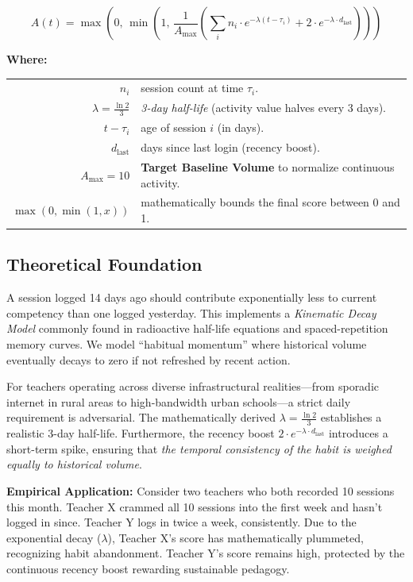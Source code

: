 \documentclass[11pt,a4paper]{article}
\begin{document}
\begin{equation}
    A(t) = \max\left(0,\, \min\left(1,\, \frac{1}{A_{\max}}\left(\sum_{i} n_i \cdot e^{-\lambda(t - \tau_i)} + 2 \cdot e^{-\lambda \cdot d_{\text{last}}}\right)\right)\right)
\end{equation}

\noindent \textbf{Where:}

\vspace{0.25em}
\noindent
\begin{tabular}{@{} r p{11cm} @{}}
    $n_i$ & session count at time $\tau_i$. \\
    $\lambda = \frac{\ln 2}{3}$ & \textit{3-day half-life} (activity value halves every 3 days). \\
    $t - \tau_i$ & age of session $i$ (in days). \\
    $d_{\text{last}}$ & days since last login (recency boost). \\
    $A_{\max} = 10$ & \textbf{Target Baseline Volume} to normalize continuous activity. \\
    $\max(0, \min(1, x))$ & mathematically bounds the final score between 0 and 1. \\
\end{tabular}

\subsection{Theoretical Foundation}
A session logged 14 days ago should contribute exponentially less to current competency than one logged yesterday. This implements a \textit{Kinematic Decay Model} commonly found in radioactive half-life equations and spaced-repetition memory curves. We model ``habitual momentum'' where historical volume eventually decays to zero if not refreshed by recent action.

For teachers operating across diverse infrastructural realities---from sporadic internet in rural areas to high-bandwidth urban schools---a strict daily requirement is adversarial. The mathematically derived $\lambda = \frac{\ln 2}{3}$ establishes a realistic 3-day half-life. Furthermore, the recency boost $2 \cdot e^{-\lambda \cdot d_{\text{last}}}$ introduces a short-term spike, ensuring that \textit{the temporal consistency of the habit is weighed equally to historical volume}.

\textbf{Empirical Application:}
Consider two teachers who both recorded 10 sessions this month. Teacher X crammed all 10 sessions into the first week and hasn't logged in since. Teacher Y logs in twice a week, consistently. Due to the exponential decay ($\lambda$), Teacher X's score has mathematically plummeted, recognizing habit abandonment. Teacher Y's score remains high, protected by the continuous recency boost rewarding sustainable pedagogy.
\end{document}
